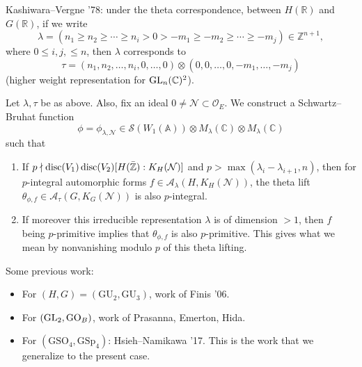\documentclass[reqno]{amsart} 
\numberwithin{theorem}{section}
\numberwithin{equation}{section}
\begin{document}
Kashiwara--Vergne '78: under the theta correspondence, between $H(\mathbb{R})$ and $G(\mathbb{R})$, if we write
\begin{equation*}
  \lambda =(n_1 \geq n_2 \geq \dotsb \geq n_i > 0 > - m_1 \geq - m_2 \geq \dotsb \geq - m_j) \in \mathbb{Z}^{n + 1},
\end{equation*}
where $0 \leq i, j, \leq n$, then $\lambda$ corresponds to
\begin{equation*}
  \tau =(n_1, n_2, \dotsc, n_i , 0, \dotsc, 0) \otimes(0, 0, \dotsc, 0, - m_1, \dotsc, - m_j)
\end{equation*}
(higher weight representation for $\operatorname{GL}_n(\mathbb{C})^2$).

\begin{theorem}[Z, 2023]
  Let $\lambda, \tau$ be as above.  Also, fix an ideal $0 \neq \mathcal{N} \subset \mathcal{O}_E$.  We construct a Schwartz--Bruhat function
  \begin{equation*}
    \phi = \phi_{\lambda, \mathcal{N}} \in \mathcal{S}(W_1(\mathbb{A})) \otimes M_\lambda(\mathbb{C}) \otimes M_\lambda(\mathbb{C})
  \end{equation*}
  such that
  \begin{enumerate}
  \item If $p \nmid \operatorname{disc}(V_1) \operatorname{disc}(V_2)[H(\bar{\mathbb{Z}}) : K_H(\mathcal{N})]$ and $p > \max(\lambda_i - \lambda_{i + 1}, n)$, then for $p$-integral automorphic forms $f \in \mathcal{A}_\lambda(H, K_H(\mathcal{N}))$, the theta lift $\theta_{\phi, f} \in \mathcal{A}_\tau(G, K_G(\mathcal{N}))$ is also $p$-integral.
  \item If moreover this irreducible representation $\lambda$ is of dimension $> 1$, then $f$ being $p$-primitive implies that $\theta_{\phi, f}$ is also $p$-primitive.  This gives what we mean by nonvanishing modulo $p$ of this theta lifting.
  \end{enumerate}
\end{theorem}
\begin{remark}
  Some previous work:
  \begin{itemize}
  \item For $(H, G) =(\mathrm{GU}_2, \mathrm{GU}_3)$, work of Finis '06.
  \item For $(\operatorname{GL}_2, \mathrm{GO}_B)$, work of Prasanna, Emerton, Hida.
  \item For $(\mathrm{GSO}_4, \mathrm{GSp}_4)$: Hsieh--Namikawa '17.  This is the work that we generalize to the present case.
  \end{itemize}
\end{remark}
\end{document}

